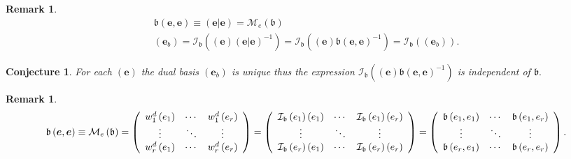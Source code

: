 \documentclass[aps,preprint]{revtex4}%
\newtheorem{conjecture}[theorem]{Conjecture}
\newtheorem{remark}[theorem]{Remark}
\begin{document}
\begin{remark}%
\begin{gather}
\mathfrak{b}\left(  \boldsymbol{e},\boldsymbol{e}\right)  \equiv\left(
\left.  \boldsymbol{e}\right\vert \boldsymbol{e}\right)  =\mathcal{M}%
_{e}\left(  \mathfrak{b}\right) \\
\left(  \mathbf{e}_{b}\right)  =\mathcal{I}_{\mathfrak{b}}\left(  \left(
\boldsymbol{e}\right)  \left(  \left.  \boldsymbol{e}\right\vert
\boldsymbol{e}\right)  ^{-1}\right)  =\mathcal{I}_{\mathfrak{b}}\left(
\left(  \boldsymbol{e}\right)  \mathfrak{b}\left(  \boldsymbol{e}%
,\boldsymbol{e}\right)  ^{-1}\right)  =\mathcal{I}_{\mathfrak{b}}\left(
\left(  \mathbf{e}_{b}\right)  \right)  .
\end{gather}

\end{remark}

\begin{conjecture}
For each $\left(  \boldsymbol{e}\right)  $ the dual basis $\left(
\mathbf{e}_{b}\right)  $ \emph{is unique} thus the expression $\mathcal{I}%
_{\mathfrak{b}}\left(  \left(  \boldsymbol{e}\right)  \mathfrak{b}\left(
\boldsymbol{e},\boldsymbol{e}\right)  ^{-1}\right)  $ is independent of
$\mathfrak{b.}$
\end{conjecture}

\begin{remark}%
\begin{equation}
\mathfrak{b}\left(  \boldsymbol{e},\boldsymbol{e}\right)  \equiv
\mathcal{M}_{e}\left(  \mathfrak{b}\right)  =\left(
\begin{array}
[c]{ccc}%
w_{1}^{d}\left(  e_{1}\right)  & \cdots & w_{1}^{d}\left(  e_{r}\right) \\
\vdots & \ddots & \vdots\\
w_{r}^{d}\left(  e_{1}\right)  & \cdots & w_{r}^{d}\left(  e_{r}\right)
\end{array}
\right)  =\left(
\begin{array}
[c]{ccc}%
\mathcal{I}_{\mathfrak{b}}\left(  e_{1}\right)  \left(  e_{1}\right)  & \cdots
& \mathcal{I}_{\mathfrak{b}}\left(  e_{1}\right)  \left(  e_{r}\right) \\
\vdots & \ddots & \vdots\\
\mathcal{I}_{\mathfrak{b}}\left(  e_{r}\right)  \left(  e_{1}\right)  & \cdots
& \mathcal{I}_{\mathfrak{b}}\left(  e_{r}\right)  \left(  e_{r}\right)
\end{array}
\right)  =\left(
\begin{array}
[c]{ccc}%
\mathfrak{b}\left(  e_{1},e_{1}\right)  & \cdots & \mathfrak{b}\left(
e_{1},e_{r}\right) \\
\vdots & \ddots & \vdots\\
\mathfrak{b}\left(  e_{r},e_{1}\right)  & \cdots & \mathfrak{b}\left(
e_{r},e_{r}\right)
\end{array}
\right)  .
\end{equation}

\end{remark}
\end{document}
